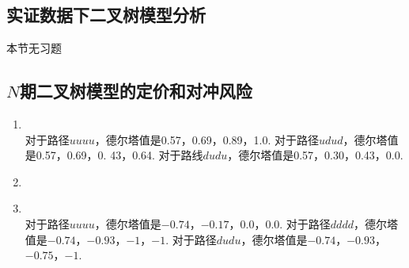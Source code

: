 \subsection{实证数据下二叉树模型分析}
本节无习题
\subsection{$N$期二叉树模型的定价和对冲风险}
\begin{enumerate}
    \item \sol\\
    对于路径$uuuu$，德尔塔值是0.57，0.69，0.89，1.0. 对于路径$udud$，德尔塔值是0.57，0.69，0. 43，0.64. 对于路线$dudu$，德尔塔值是0.57，0.30，0.43，0.0.
    \item \omitted
    \item \sol\\
    对于路径$uuuu$，德尔塔值是$-0.74$，$-0. 17$，0.0，0.0. 对于路径$dddd$，德尔塔值是$-0.74$，$-0.93$，$-1$，$-1$. 对于路径$dudu$，德尔塔值是$-0.74$，$-0.93$，$-0.75$，$-1$.
\end{enumerate}
\clearpage